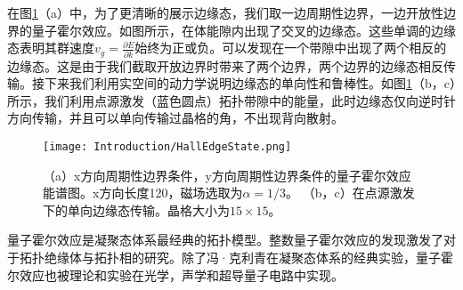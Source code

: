 在图\ref{fig:HallEdgeState}（a）中，为了更清晰的展示边缘态，我们取一边周期性边界，一边开放性边界的量子霍尔效应。如图所示，在体能隙内出现了交叉的边缘态。这些单调的边缘态表明其群速度$v_g=\frac{\partial E}{\partial k}$始终为正或负。可以发现在一个带隙中出现了两个相反的边缘态。这是由于我们截取开放边界时带来了两个边界，两个边界的边缘态相反传输。接下来我们利用实空间的动力学说明边缘态的单向性和鲁棒性。如图\ref{fig:HallEdgeState}（b，c）所示，我们利用点源激发（蓝色圆点）拓扑带隙中的能量，此时边缘态仅向逆时针方向传输，并且可以单向传输过晶格的角，不出现背向散射。

\begin{figure}[htbp]
	\centering
	\texttt{[image: Introduction/HallEdgeState.png]}
 \caption{
	（a）x方向周期性边界条件，y方向周期性边界条件的量子霍尔效应能谱图。x方向长度120，磁场选取为$\alpha=1/3$。
	（b，c）在点源激发下的单向边缘态传输。晶格大小为$15\times15$。
	}
 \label{fig:HallEdgeState}
\end{figure}

量子霍尔效应是凝聚态体系最经典的拓扑模型。整数量子霍尔效应的发现激发了对于拓扑绝缘体与拓扑相的研究。除了冯·克利青在凝聚态体系的经典实验\cite{klitzing1980new}，量子霍尔效应也被理论和实验在光学\cite{Haldane2008prl,Haldane2008pra,ZhengWang2008prl,wang2009observation,hafezi2011robust,hafezi2013imaging,rechtsman2013strain}，声学\cite{wen2019acoustic}和超导量子电路\cite{xiang2023simulating,wang2024realization}中实现。

